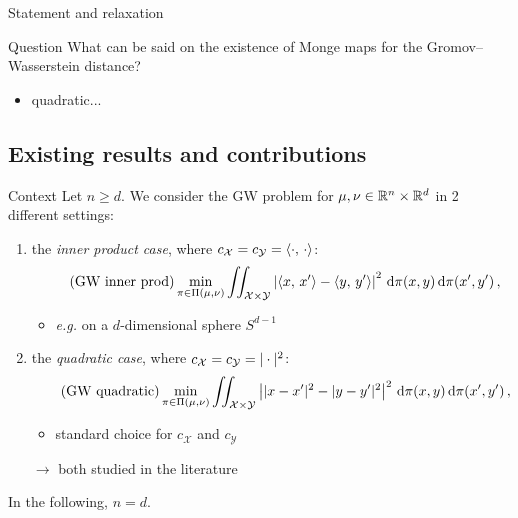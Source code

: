 \documentclass[9pt,xcolor={dvipsnames}]{beamer}
\begin{document}
\begin{frame}{Statement and relaxation}

    \begin{block}{Question}
        What can be said on the existence of Monge maps for the Gromov--Wasserstein distance?
    \end{block}

    \begin{itemize}
        \item quadratic...
    \end{itemize}

    \end{frame}

\subsection{Existing results and contributions}
\begin{frame}{Context}
    Let $n\geq d$. We consider the GW problem for $\mu,\nu\in\mathbb{R}^n\times\mathbb{R}^d$ in 2 different settings:
    \begin{enumerate}
        \item the \emph{inner product case}, where $c_{\mathcal{X}}=c_{\mathcal{Y}}=\langle\cdot,\,\cdot\rangle$:
            \begin{equation}
                \tag{GW inner prod}
                \min _{\pi \in \Pi(\mu, \nu)} \iint_{\mathcal{X}\times\mathcal{Y}}\left|\langle x,\, x'\rangle-\langle y,\, y'\rangle\right|^{2} \,\mathrm d\pi(x, y) \,\mathrm d\pi(x', y')\,,
                \label{eqn:GW-inner-prod}
            \end{equation}
            \begin{itemize}
                \item \textit{e.g.} on a $d$-dimensional sphere $ S^{d-1}$
            \end{itemize}
            \item the \emph{quadratic case}, where $c_{\mathcal{X}}=c_{\mathcal{Y}}=|\cdot|^2$:
            \begin{equation}
                \tag{GW quadratic}
                \min _{\pi \in \Pi(\mu, \nu)} \iint_{\mathcal{X}\times\mathcal{Y}}\left||x-x'|^2-|y-y'|^2\right|^{2} \,\mathrm d\pi(x, y) \,\mathrm d\pi(x', y')\,,
                \label{eqn:GW-quadratic}
            \end{equation}
            \begin{itemize}
                \item standard choice for $c_{\mathcal{X}}$ and $c_{\mathcal{Y}}$
            \end{itemize}
            \item[$\to$] both studied in the literature \cite{alvarez2019towards,vayer2020contribution}
        \end{enumerate}
        In the following, $n=d$.
\end{frame}
\end{document}
